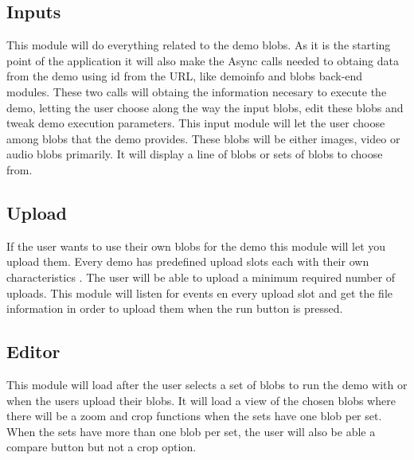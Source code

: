 \subsection{Inputs}
This module will do everything  related to the demo blobs. As it is the starting point of the 
application it will also make the Async calls needed to obtaing data from the demo using id  from the URL, like  demoinfo 
and blobs back-end modules. These two calls will obtaing the information necesary  to execute the demo, letting  the 
user choose along the way  the input blobs, edit these blobs  and tweak demo execution parameters.
This input module will let  the user choose among blobs that the demo provides. These blobs will be either images, video   or 
audio blobs primarily. It will  display a line of blobs or sets of blobs to choose from.


\subsection{Upload}
If the user wants to use their  own blobs for the demo this module will let you  upload them. Every demo has predefined 
upload slots each with their own characteristics . The user will  be able to upload a  minimum required number of uploads.
This module will  listen for events en  every upload slot and get the file information in order to upload them when the run 
button is pressed.

\subsection{Editor}
This module will  load after the user selects a set of blobs to run the demo with or when the users upload their blobs. It will load a view of the chosen blobs where there will be a zoom and crop functions when the sets have 
one blob per set. When the sets have more than one blob per set, the user will also be able a  compare button but not a crop 
option.

